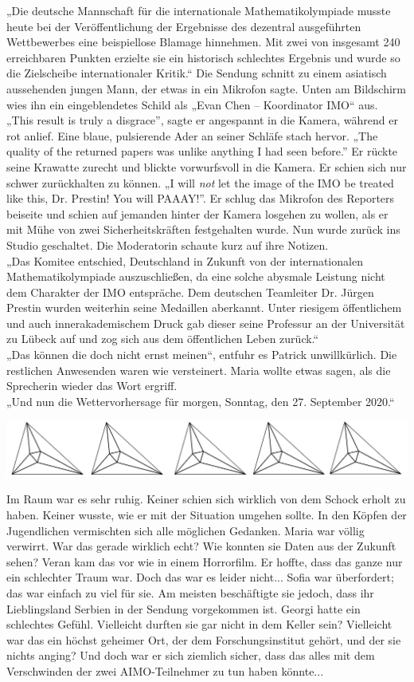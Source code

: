 \documentclass[oneside]{memoir}
\newcommand{\parasep}{
\bigskip
\bigskip
\begin{center} 
   \includegraphics[scale=.08]{parasep5.jpg} 
\end{center}
\bigskip
\bigskip
}
\begin{document}
„Die deutsche Mannschaft für die internationale Mathematikolympiade musste heute bei der Veröffentlichung der Ergebnisse des dezentral ausgeführten Wettbewerbes eine beispiellose Blamage hinnehmen. Mit zwei von insgesamt 240 erreichbaren Punkten erzielte sie ein historisch schlechtes Ergebnis und wurde so die Zielscheibe internationaler Kritik.“
Die Sendung schnitt zu einem asiatisch aussehenden jungen Mann, der etwas in ein Mikrofon sagte. Unten am Bildschirm wies ihn ein eingeblendetes Schild als „Evan Chen – Koordinator IMO“ aus. \\
„This result is truly a disgrace”, sagte er angespannt in die Kamera, während er rot anlief. Eine blaue, pulsierende Ader an seiner Schläfe stach hervor. „The quality of the returned papers was unlike anything I had seen before.” Er rückte seine Krawatte zurecht und blickte vorwurfsvoll in die Kamera. Er schien sich nur schwer zurückhalten zu können. „I will \textit{not} let the image of the IMO be treated like this, Dr. Prestin! You will PAAAY!”. Er schlug das Mikrofon des Reporters beiseite und schien auf jemanden hinter der Kamera losgehen zu wollen, als er mit Mühe von zwei Sicherheitskräften festgehalten wurde. Nun wurde zurück ins Studio geschaltet. Die Moderatorin schaute kurz auf ihre Notizen. \\
„Das Komitee entschied, Deutschland in Zukunft von der internationalen Mathematikolympiade auszuschließen, da eine solche abysmale Leistung nicht dem Charakter der IMO entspräche. Dem deutschen Teamleiter Dr. Jürgen Prestin wurden weiterhin seine Medaillen aberkannt. Unter riesigem öffentlichem und auch innerakademischem Druck gab dieser seine Professur an der Universität zu Lübeck auf und zog sich aus dem öffentlichen Leben zurück.“ \\
„Das können die doch nicht ernst meinen“, entfuhr es Patrick unwillkürlich. Die restlichen Anwesenden waren wie versteinert. Maria wollte etwas sagen, als die Sprecherin wieder das Wort ergriff. \\
„Und nun die Wettervorhersage für morgen, Sonntag, den 27. September 2020.“

     
     \parasep
     
Im Raum war es sehr ruhig. Keiner schien sich wirklich von dem Schock erholt zu haben. Keiner wusste, wie er mit der Situation umgehen sollte. 
In den Köpfen der Jugendlichen vermischten sich alle möglichen Gedanken.
Maria war völlig verwirrt. War das gerade wirklich echt? Wie konnten sie Daten aus der Zukunft sehen?
Veran kam das vor wie in einem Horrorfilm. Er hoffte, dass das ganze nur ein schlechter Traum war. Doch das war es leider nicht...
Sofia war überfordert; das war einfach zu viel für sie. Am meisten beschäftigte sie jedoch, dass ihr Lieblingsland Serbien in der Sendung vorgekommen ist.
Georgi hatte ein schlechtes Gefühl. Vielleicht durften sie gar nicht in dem Keller sein? Vielleicht war das ein höchst geheimer Ort, der dem Forschungsinstitut gehört, und der sie nichts anging? Und doch war er sich ziemlich sicher, dass das alles mit dem Verschwinden der zwei AIMO-Teilnehmer zu tun haben könnte...
\end{document}
